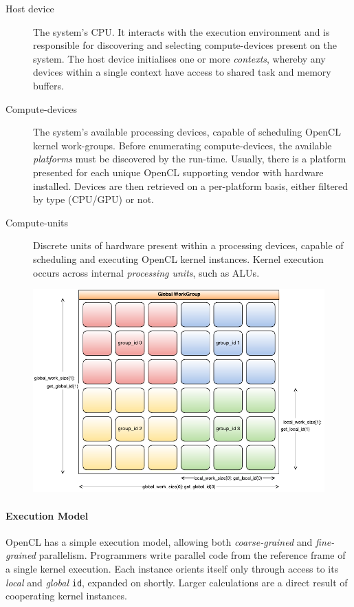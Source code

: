 \begin{description}
\item[Host device] The system's \ac{CPU}. It interacts with the execution environment and is responsible for discovering and selecting compute-devices present on the system. The host device initialises one or more \emph{contexts}, whereby any devices within a single context have access to shared task and memory buffers.

\item[Compute-devices] The system's available processing devices, capable of scheduling \ac{OpenCL} kernel work-groups. Before enumerating compute-devices, the available \emph{platforms} must be discovered by the run-time. Usually, there is a platform presented for each unique \ac{OpenCL} supporting vendor with hardware installed. Devices are then retrieved on a per-platform basis, either filtered by type (\ac{CPU}/\ac{GPU}) or not.

\item[Compute-units] Discrete units of hardware present within a processing devices, capable of scheduling and executing \ac{OpenCL} kernel instances.
Kernel execution occurs across internal \emph{processing units}, such as \acp{ALU}.
\end{description}

\begin{figure}[h]
	\includegraphics[width=\textwidth]{./figures/workgroups}
	\label{fig:ocl_ex_model}
\end{figure}

\paragraph*{Execution Model}
\ac{OpenCL} has a simple execution model, allowing both \emph{coarse-grained} and \emph{fine-grained} parallelism. Programmers write parallel code from the reference frame of a single kernel execution. Each instance orients itself only through access to its \emph{local} and \emph{global} \verb|id|, expanded on shortly. Larger calculations are a direct result of cooperating kernel instances. 

